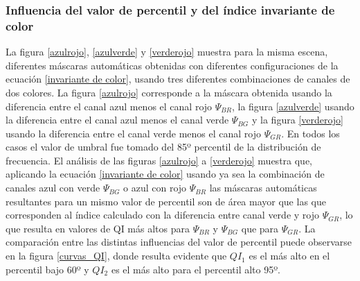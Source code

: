 

\subsubsection{Influencia del valor de percentil y del índice invariante de color}

La figura \ref{azulrojo}, \ref{azulverde} y \ref{verderojo} muestra para la misma escena, diferentes máscaras automáticas obtenidas con diferentes configuraciones de la ecuación \ref{invariante de color}, usando tres diferentes combinaciones de canales de dos colores. La figura \ref{azulrojo} corresponde a la máscara obtenida usando la diferencia entre el canal azul menos el canal rojo $\Psi_{BR}$, la figura \ref{azulverde} usando la diferencia entre el canal azul menos el canal verde $\Psi_{BG}$ y la figura \ref{verderojo} usando la diferencia entre el canal verde menos el canal rojo $\Psi_{GR}$. En todos los casos el valor de umbral fue tomado del 85º percentil de la distribución de frecuencia. El análisis de las figuras \ref{azulrojo} a \ref{verderojo} muestra que, aplicando la ecuación \ref{invariante de color} usando ya sea la combinación de canales azul con verde $\Psi_{BG}$ o azul con rojo $\Psi_{BR}$  las máscaras automáticas resultantes para un mismo valor de percentil son de área mayor que las que corresponden al índice calculado con la diferencia entre canal verde y rojo $\Psi_{GR}$, lo que resulta en valores de QI más altos para $\Psi_{BR}$ y $\Psi_{BG}$ que para $\Psi_{GR}$. La comparación entre las distintas influencias del valor de percentil puede observarse en la figura \ref{curvas_QI}, donde resulta evidente que $QI_1$ es el más alto en el percentil bajo 60º y $QI_2$ es el más alto para el percentil alto 95º. 

